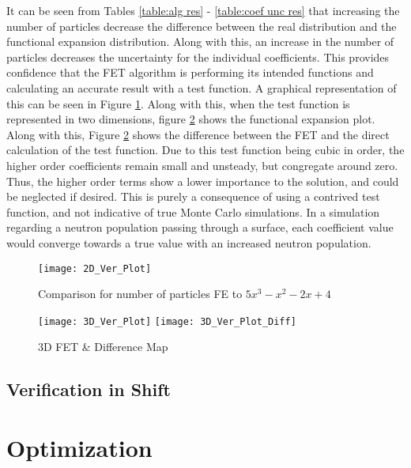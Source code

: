 \documentclass[10tma4paper]{article}
\begin{document}
It can be seen from Tables \ref{table:alg res} - \ref{table:coef unc res} that increasing the number of particles decrease the difference between the real distribution and the functional expansion distribution. Along with this, an increase in the number of particles decreases the uncertainty for the individual coefficients. This provides confidence that the FET algorithm is performing its intended functions and calculating an accurate result with a test function. A graphical representation of this can be seen in Figure \ref{2D Plot}. Along with this, when the test function is represented in two dimensions, figure \ref{3D Plot} shows the functional expansion plot. Along with this, Figure \ref{3D Plot} shows the difference between the FET and the direct calculation of the test function. Due to this test function being cubic in order, the higher order coefficients remain small and unsteady, but congregate around zero. Thus, the higher order terms show a lower importance to the solution, and could be neglected if desired. This is purely a consequence of using a contrived test function, and not indicative of true Monte Carlo simulations. In a simulation regarding a neutron population passing through a surface, each coefficient value would converge towards a true value with an increased neutron population.
\\
\begin{figure}[!htbp]
	\caption{Comparison for number of particles FE to $5x^{3}-x^{2}-2x+4$}
	\begin{center}
	\texttt{[image: 2D\_Ver\_Plot]}
	\label{2D Plot}
	\end{center}
\end{figure}
\begin{figure}[!htbp]
	\caption{3D FET \& Difference Map}
	\begin{center}
		\texttt{[image: 3D\_Ver\_Plot]}
		\texttt{[image: 3D\_Ver\_Plot\_Diff]}
	\end{center}
	\label{3D Plot}
\end{figure}


\subsection{Verification in Shift}\label{P2}

\section{Optimization}\label{optimization}
\end{document}
